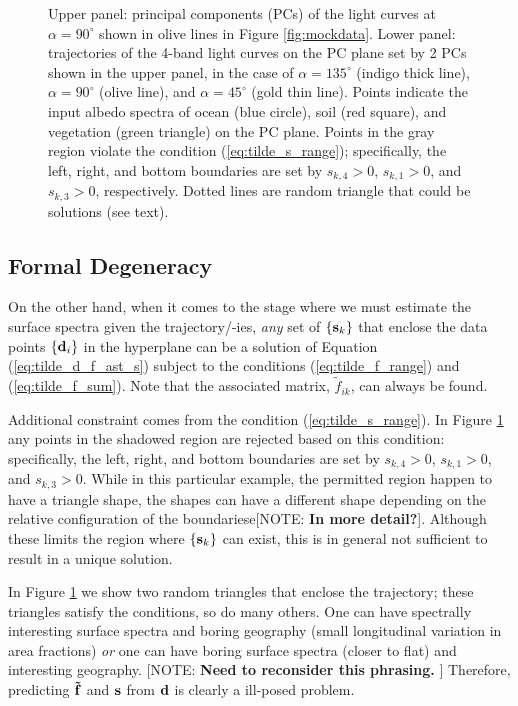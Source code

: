 \documentclass[iop,numberedappendix,apj,]{emulateapj}
\def\fast{\tilde f}
\def\memoYF#1{\color{red}[NOTE: {\bf #1}]\color{black}}
\begin{document}
\begin{figure}[t]
    \caption{Upper panel: principal components (PCs) of the light curves at $\alpha = 90^{\circ }$ shown in olive lines in Figure \ref{fig:mockdata}. Lower panel: trajectories of the 4-band light curves on the PC plane set by 2 PCs shown in the upper panel, in the case of $\alpha = 135^{\circ }$ (indigo thick line), $\alpha = 90^{\circ }$ (olive line), and $\alpha = 45^{\circ }$ (gold thin line). Points indicate the input albedo spectra of ocean (blue circle), soil (red square), and vegetation (green triangle) on the PC plane. Points in the gray region violate the condition (\ref{eq:tilde_s_range}); specifically, the left, right, and bottom boundaries are set by $s_{k,4}> 0$, $s_{k,1}> 0$, and $s_{k,3}> 0$, respectively. 
Dotted lines are random triangle that could be solutions (see text). }
    \label{fig:trajectory}
\end{figure}

\subsection{Formal Degeneracy}
\label{ss:degeneracy}

On the other hand, when it comes to the stage where we must estimate the surface spectra given the trajectory/-ies, {\it any} set of $\{ {\bf s}_k \}$ that enclose the data points $\{{\bf d}_i\}$ in the hyperplane can be a solution of Equation (\ref{eq:tilde_d_f_ast_s}) subject to the conditions (\ref{eq:tilde_f_range}) and (\ref{eq:tilde_f_sum}). 
Note that the associated matrix, $\fast _{ik}$, can always be found. 

Additional constraint comes from the condition (\ref{eq:tilde_s_range}). 
In Figure \ref{fig:trajectory} any points in the shadowed region are rejected based on this condition: specifically, the left, right, and bottom boundaries are set by $s_{k,4}> 0$, $s_{k,1}> 0$, and $s_{k,3}> 0$. 
While in this particular example, the permitted region happen to have a triangle shape, the shapes can have a different shape depending on the relative configuration of the boundariese\memoYF{In more detail?}. 
Although these limits the region where $\{ {\bf s}_k \}$ can exist,   
this is in general not sufficient to result in a unique solution. 

In Figure \ref{fig:trajectory} we show two random triangles that enclose the trajectory; these triangles satisfy the conditions, so do many others. 
One can have spectrally interesting surface spectra and boring geography (small longitudinal variation in area fractions) {\it or} one can have boring surface spectra (closer to flat) and interesting geography. \memoYF{Need to reconsider this phrasing. }
Therefore, predicting ${\bf \fast }$ and ${\bf s}$ from ${\bf d}$ is clearly a ill-posed problem. 
\end{document}
